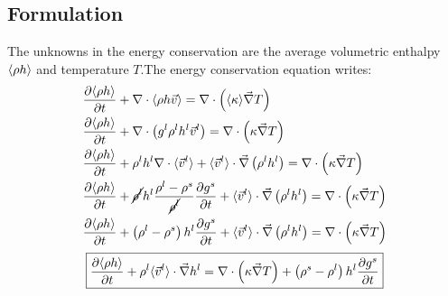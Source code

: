 \subsection{Formulation}
The unknowns in the energy conservation are the average volumetric enthalpy $\langle \rho h \rangle$ and temperature $T$.The energy conservation equation writes:
\begin{subequations}
\begin{align}
	& \frac{\partial \langle \rho h \rangle}{\partial t} + \nabla \cdot \langle \rho h \vec{v} \rangle 
	= \nabla  \cdot \left( \langle \kappa \rangle \vec{\nabla} T  \right) \\
	& \frac{\partial \langle \rho h \rangle}{\partial t} + \nabla \cdot \left( {g^l} \rho^l h^l \vec{v}^l \right)
	= \nabla  \cdot \left( \kappa \vec{\nabla} T  \right) \\ 
	& \frac{\partial \langle \rho h \rangle}{\partial t} 
		+ \rho^l h^l  \nabla \cdot \langle \vec{v}^l \rangle
		+ \langle \vec{v}^l \rangle \cdot \vec{\nabla} \left( \rho^l h^l \right)
		= \nabla  \cdot \left( \kappa \vec{\nabla} T  \right) \\   
	& \frac{\partial \langle \rho h \rangle}{\partial t} 
		+ \cancel{\rho^l} h^l  \frac{\rho^l-\rho^s}{\cancel{\rho^l}} \frac{\partial  {g^s} }{\partial t}
		+ \langle \vec{v}^l \rangle \cdot \vec{\nabla} \left( \rho^l h^l \right)
		= \nabla  \cdot \left( \kappa \vec{\nabla} T  \right) \\ 
	& \frac{\partial \langle \rho h \rangle}{\partial t} 
		+ \left( \rho^l-\rho^s \right) h^l \frac{\partial  {g^s} }{\partial t}
		+ \langle \vec{v}^l \rangle \cdot \vec{\nabla} \left( \rho^l h^l \right)
		= \nabla  \cdot \left( \kappa \vec{\nabla} T  \right)        
\end{align}
\end{subequations}
\begin{align}
\label{eq:energy_balance}
 \boxed{ \frac{\partial \langle \rho h \rangle}{\partial t} 
		+ \rho^l \langle \vec{v}^l \rangle \cdot \vec{\nabla} h^l
		= \nabla  \cdot \left( \kappa \vec{\nabla} T  \right)
		+ \left( \rho^s-\rho^l \right) h^l \frac{\partial  {g^s}}{\partial t}}
\end{align}

